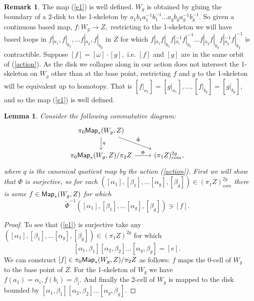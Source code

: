 \documentclass{amsart}
\newtheorem{lemma}[theorem]{Lemma}
\theoremstyle{definition}
\newtheorem{remark}[theorem]{Remark}
\theoremstyle{remark}
\begin{document}
\begin{remark}
The map (\ref{e1}) is well defined. $W_{g}$ is obtained by gluing the boundary of a 2-disk to the 1-skeleton by $a_{1}b_{1}a_{1}^{-1}b_{1}^{-1}\hdots a_{g}b_{g}a_{g}^{-1}b_{g}^{-1}.$ So given a continuous based map, $f: W_{g} \rightarrow Z,$ restricting to the 1-skeleton we will have based loops in $f|_{a_{1}}, f|_{b_{1}}, \hdots f|_{a_{g}}, f|_{b_{g}}$ in $Z$ for which $f|_{a_{1}}f|_{b_{1}}f|_{a_{1}}^{-1}f|_{b_{1}}^{-1}\hdots f|_{a_{g}}f|_{b_{g}}f|_{a_{g}}^{-1}f|_{b_{g}}^{-1}$ is contractible. 
Suppose $[f] = [\omega] \cdot [g],$ i.e. $[f]$ and $[g]$ are in the same orbit of (\ref{action}). As the disk we collapse along in our action does not intersect the 1-skeleton on $W_{g}$ other than at the base point, restricting $f$ and $g$ to the 1-skeleton will be equivalent up to homotopy. That is $[f|_{a_{1}}] = [g|_{a_{1}}], \hdots, [f|_{b_{g}}] = [g|_{b_{g}}],$ and so the map (\ref{e1}) is well defined.
\end{remark}


\begin{lemma} \label{l1}
Consider the following commutative diagram:
$$\begin{tikzcd}
\pi_{0}{\sf Map}_{\ast}(W_{g}, Z) \arrow[d, "q"] \arrow[rd, "\tilde{\Phi}"] & \\
\pi_{0}{\sf Map}_{\ast}(W_{g}, Z)/\pi_{2}Z \arrow[r, "\Phi"]&  (\pi_{1}Z)^{2g}_{com},
\end{tikzcd}$$
where $q$ is the canonical quotient map by the action (\ref{action}).
First we will show that $\Phi$ is surjective, so for each $([\alpha_{1}], [\beta_{1}], \hdots [\alpha_{g}], [\beta_{g}]) \in (\pi_{1}Z)^{2g}_{com}$ there is some $f \in {\sf Map}_{\ast}(W_{g}, Z)$ for which $$\tilde{\Phi}^{-1}([\alpha_{1}], [\beta_{1}], \hdots [\alpha_{g}], [\beta_{g}]) \ni [f].$$ 
\end{lemma}
\begin{proof}
To see that (\ref{e1}) is surjective take any $([\alpha_{1}], [\beta_{1}], \hdots [\alpha_{g}], [\beta_{g}]) \in (\pi_{1}Z)^{2g}$ for which $$[\alpha_{1}, \beta_{1}][\alpha_{2}, \beta_{2}]\hdots[\alpha_{g}, \beta_{g}] = [e].$$ We can construct $[f] \in \pi_{0}{\sf Map}_{\ast}(W_{g}, Z)/\pi_{2}Z$ as follows:
$f$ maps the 0-cell of $W_{g}$ to the base point of $Z.$ For the 1-skeleton of $W_{g}$ we have $f(a_{1}) = \alpha_{i}, f(b_{i}) = \beta_{i}.$ And finally the 2-cell of $W_{g}$ is mapped to the disk bounded by $[\alpha_{1}, \beta_{1}][\alpha_{2}, \beta_{2}]\hdots[\alpha_{g}, \beta_{g}].$ 
\end{proof}
\end{document}
